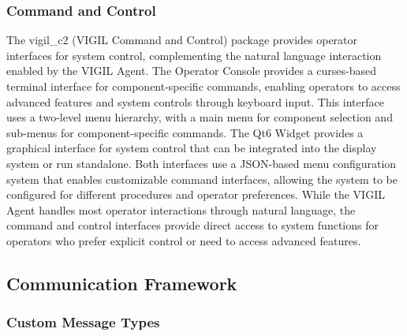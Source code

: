 \documentclass[12pt,a4paper]{article}
\begin{document}
\subsubsection{Command and Control}

The vigil\_c2 (VIGIL Command and Control) package provides operator interfaces for system control, complementing the natural language interaction enabled by the VIGIL Agent. The Operator Console provides a curses-based terminal interface for component-specific commands, enabling operators to access advanced features and system controls through keyboard input. This interface uses a two-level menu hierarchy, with a main menu for component selection and sub-menus for component-specific commands. The Qt6 Widget provides a graphical interface for system control that can be integrated into the display system or run standalone. Both interfaces use a JSON-based menu configuration system that enables customizable command interfaces, allowing the system to be configured for different procedures and operator preferences. While the VIGIL Agent handles most operator interactions through natural language, the command and control interfaces provide direct access to system functions for operators who prefer explicit control or need to access advanced features.

\subsection{Communication Framework}

\subsubsection{Custom Message Types}
\end{document}

